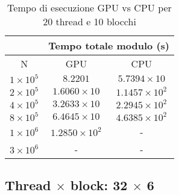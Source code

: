 \begin{table}[ht!]
    \begin{center}
        \renewcommand{\arraystretch}{1.5}
        \begin{adjustbox}{width=.45\textwidth}
            \begin{tabular}{ |c|c|c| }
                \hline
                \multicolumn{1}{|c}{} & \multicolumn{2}{|c|}{Tempo totale modulo (s)} \\
                \hline
                 N & GPU & CPU \\
                 \hline 
                 $1 \times 10^5$ & $8.2201$ & $5.7394 \times 10$ \\
                 \hline 
                 $2 \times 10^5$ & $1.6060 \times 10$ & $1.1457 \times 10^{2}$ \\
                 \hline 
                 $4 \times 10^5$ & $3.2633 \times 10$ & $2.2945 \times 10^{2}$ \\
                 \hline 
                 $8 \times 10^5$ & $6.4645 \times 10$ & $4.6385 \times 10^{2}$ \\
                 \hline 
                 $1 \times 10^6$ & $1.2850 \times 10^{2}$ & - \\
                 \hline 
                 $3 \times 10^6$ & - & - \\
                 \hline 
            \end{tabular}
        \end{adjustbox}
    \end{center}
    \caption{Tempo di esecuzione GPU vs CPU per 20 thread e 10 blocchi}
    \label{tab:time_table_20x10}
\end{table}


\newpage
\subsection{Thread $\times$ block: 32 $\times$ 6}

